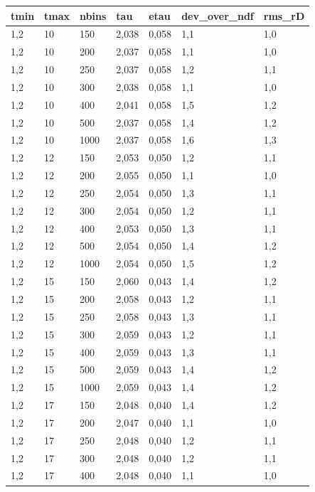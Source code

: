     \begin{tabular}{lllllll}
    \hline
        tmin & tmax & nbins & tau & etau & dev\_over\_ndf & rms\_rD \\ \hline
        1,2 & 10 & 150 & 2,038 & 0,058 & 1,1 & 1,0 \\ 
        1,2 & 10 & 200 & 2,037 & 0,058 & 1,1 & 1,0 \\ 
        1,2 & 10 & 250 & 2,037 & 0,058 & 1,2 & 1,1 \\ 
        1,2 & 10 & 300 & 2,038 & 0,058 & 1,1 & 1,0 \\ 
        1,2 & 10 & 400 & 2,041 & 0,058 & 1,5 & 1,2 \\ 
        1,2 & 10 & 500 & 2,037 & 0,058 & 1,4 & 1,2 \\ 
        1,2 & 10 & 1000 & 2,037 & 0,058 & 1,6 & 1,3 \\ 
        1,2 & 12 & 150 & 2,053 & 0,050 & 1,2 & 1,1 \\ 
        1,2 & 12 & 200 & 2,055 & 0,050 & 1,1 & 1,0 \\ 
        1,2 & 12 & 250 & 2,054 & 0,050 & 1,3 & 1,1 \\ 
        1,2 & 12 & 300 & 2,054 & 0,050 & 1,2 & 1,1 \\ 
        1,2 & 12 & 400 & 2,053 & 0,050 & 1,3 & 1,1 \\ 
        1,2 & 12 & 500 & 2,054 & 0,050 & 1,4 & 1,2 \\ 
        1,2 & 12 & 1000 & 2,054 & 0,050 & 1,5 & 1,2 \\ 
        1,2 & 15 & 150 & 2,060 & 0,043 & 1,4 & 1,2 \\ 
        1,2 & 15 & 200 & 2,058 & 0,043 & 1,2 & 1,1 \\ 
        1,2 & 15 & 250 & 2,058 & 0,043 & 1,3 & 1,1 \\ 
        1,2 & 15 & 300 & 2,059 & 0,043 & 1,2 & 1,1 \\ 
        1,2 & 15 & 400 & 2,059 & 0,043 & 1,3 & 1,1 \\ 
        1,2 & 15 & 500 & 2,059 & 0,043 & 1,4 & 1,2 \\ 
        1,2 & 15 & 1000 & 2,059 & 0,043 & 1,4 & 1,2 \\ 
        1,2 & 17 & 150 & 2,048 & 0,040 & 1,4 & 1,2 \\ 
        1,2 & 17 & 200 & 2,047 & 0,040 & 1,1 & 1,0 \\ 
        1,2 & 17 & 250 & 2,048 & 0,040 & 1,2 & 1,1 \\ 
        1,2 & 17 & 300 & 2,048 & 0,040 & 1,2 & 1,1 \\ 
        1,2 & 17 & 400 & 2,048 & 0,040 & 1,1 & 1,0 \\ 

\end{tabular}
